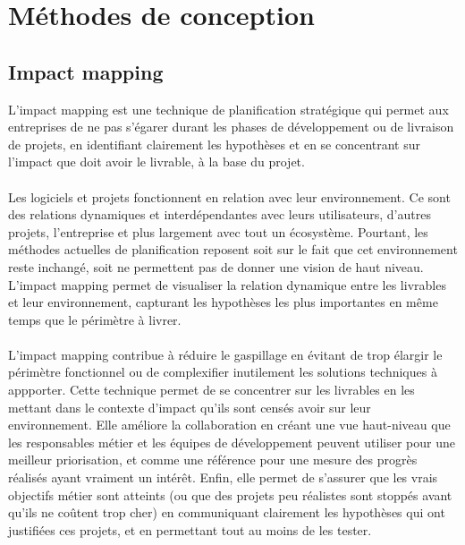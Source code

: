 	\newpage
\section{Méthodes de conception}
		
		\subsection{Impact mapping}
L'impact mapping est une technique de planification stratégique qui permet aux entreprises de ne pas s'égarer durant les phases de développement ou de livraison de projets, en identifiant clairement les hypothèses et en se concentrant sur l'impact que doit avoir le livrable, à la base du projet.

\paragraph{} 
Les logiciels et projets fonctionnent en relation avec leur environnement. Ce sont des relations dynamiques et interdépendantes avec leurs utilisateurs, d'autres projets, l'entreprise et plus largement avec tout un écosystème. Pourtant, les méthodes actuelles de planification reposent soit sur le fait que cet environnement reste inchangé, soit ne permettent pas de donner une vision de haut niveau. L'impact mapping permet de visualiser la relation dynamique entre les livrables et leur environnement, capturant les hypothèses les plus importantes en même temps que le périmètre à livrer\cite{Adzi12}.		

\paragraph{}L'impact mapping contribue à réduire le gaspillage en évitant de trop élargir le périmètre fonctionnel ou de complexifier inutilement les solutions techniques à appporter. Cette technique permet de se concentrer sur les livrables en les mettant dans le contexte d'impact qu'ils sont censés avoir sur leur environnement. Elle améliore la collaboration en créant une vue haut-niveau que les responsables métier et les équipes de développement peuvent utiliser pour une meilleur priorisation, et comme une référence pour une mesure des progrès réalisés ayant vraiment un intérêt. Enfin, elle permet de s'assurer que les vrais objectifs métier sont atteints (ou que des projets peu réalistes sont stoppés avant qu'ils ne coûtent trop cher) en communiquant clairement les hypothèses qui ont justifiées ces projets, et en permettant tout au moins de les tester.

